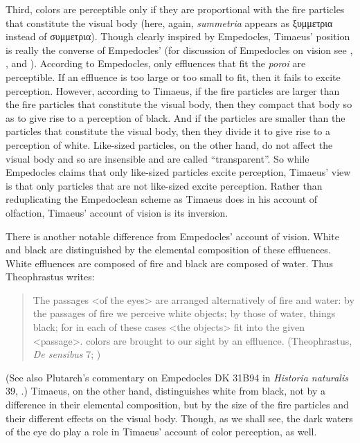 Third, colors are perceptible only if they are proportional with the fire particles that constitute the visual body (here, again, \emph{summetria} appears as {\sbl ξυμμετρια} instead of {\sbl συμμετρια}). Though clearly inspired by Empedocles, Timaeus' position is really the converse of Empedocles' (for discussion of Empedocles on vision see \citealt{Sedley:1992uq}, \citealt{Ierodiakonou:2005fk}, and \citealt[chapter 1]{Kalderon:2015fr}). According to Empedocles, only effluences that fit the \emph{poroi} are perceptible. If an effluence is too large or too small to fit, then it fails to excite perception. However, according to Timaeus, if the fire particles are larger than the fire particles that constitute the visual body, then they compact that body so as to give rise to a perception of black. And if the particles are smaller than the particles that constitute the visual body, then they divide it to give rise to a perception of white. Like-sized particles, on the other hand, do not affect the visual body and so are insensible and are called ``transparent''. So while Empedocles claims that only like-sized particles excite perception, Timaeus' view is that only particles that are not like-sized excite perception. Rather than reduplicating the Empedoclean scheme as Timaeus does in his account of olfaction, Timaeus' account of vision is its inversion.

There is another notable difference from Empedocles' account of vision. White and black are distinguished by the elemental composition of these effluences. White effluences are composed of fire and black are composed of water. Thus Theophrastus writes: 
\begin{quote}
	The passages <of the eyes> are arranged alternatively of fire and water: by the passages of fire we perceive white objects; by those of water, things black; for in each of these cases <the objects> fit into the given <passage>. colors are brought to our sight by an effluence. (Theophrastus, \emph{De sensibus} 7; \citealt[71--3]{Stratton:1917vn})
\end{quote}
(See also Plutarch's commentary on Empedocles DK 31B94 in \emph{Historia naturalis} 39, \citealt[CTXT-87 137--8]{Inwood:2001ve}.) Timaeus, on the other hand, distinguishes white from black, not by a difference in their elemental composition, but by the size of the fire particles and their different effects on the visual body. Though, as we shall see, the dark waters of the eye do play a role in Timaeus' account of color perception, as well.

